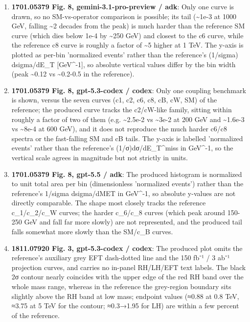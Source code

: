 \begin{enumerate}
\item \textbf{1701.05379 Fig. 8, gemini-3.1-pro-preview / adk}: Only one curve is drawn, so no SM-vs-operator comparison is possible; its tail (\textasciitilde{}1e-3 at 1000 GeV, falling \textasciitilde{}2 decades from the peak) is much harder than the reference SM curve (which dies below 1e-4 by \textasciitilde{}250 GeV) and closest to the c6 curve, while the reference c8 curve is roughly a factor of \textasciitilde{}5 higher at 1 TeV. The y-axis is plotted as per-bin 'normalized events' rather than the reference's (1/sigma) dsigma/dE\_T [GeV\textasciicircum{}-1], so absolute vertical values differ by the bin width (peak \textasciitilde{}0.12 vs \textasciitilde{}0.2-0.5 in the reference).
\item \textbf{1701.05379 Fig. 8, gpt-5.3-codex / codex}: Only one coupling benchmark is shown, versus the seven curves (c1, c2, c6, c8, cB, cW, SM) of the reference; the produced curve tracks the c2/cW-like family, sitting within roughly a factor of two of them (e.g. \textasciitilde{}2.5e-2 vs \textasciitilde{}3e-2 at 200 GeV and \textasciitilde{}1.6e-3 vs \textasciitilde{}8e-4 at 600 GeV), and it does not reproduce the much harder c6/c8 spectra or the fast-falling SM and cB tails. The y-axis is labelled 'normalized events' rather than the reference's (1/σ)dσ/dE\_T\textasciicircum{}miss in GeV\textasciicircum{}-1, so the vertical scale agrees in magnitude but not strictly in units.
\item \textbf{1701.05379 Fig. 8, gpt-5.5 / adk}: The produced histogram is normalized to unit total area per bin (dimensionless 'normalized events') rather than the reference's 1/sigma dsigma/dMET in GeV\textasciicircum{}-1, so absolute y-values are not directly comparable. The shape most closely tracks the reference c\_1/c\_2/c\_W curves; the harder c\_6/c\_8 curves (which peak around 150-250 GeV and fall far more slowly) are not represented, and the produced tail falls somewhat more slowly than the SM/c\_B curves.
\item \textbf{1811.07920 Fig. 3, gpt-5.3-codex / codex}: The produced plot omits the reference's auxiliary grey EFT dash-dotted line and the 150 fb⁻¹ / 3 ab⁻¹ projection curves, and carries no in-panel RH/LH/EFT text labels. The black 2σ contour nearly coincides with the upper edge of the red RH band over the whole mass range, whereas in the reference the grey-region boundary sits slightly above the RH band at low mass; endpoint values (≈0.88 at 0.8 TeV, ≈3.75 at 5 TeV for the contour; ≈0.3→1.95 for LH) are within a few percent of the reference.

\end{enumerate}
